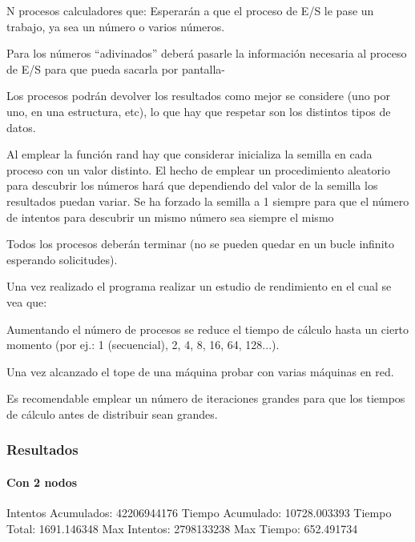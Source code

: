 \documentclass{article}
\begin{document}
	N procesos calculadores que: 
		Esperarán a que el proceso de E/S le pase un trabajo, ya sea un número o varios números. 

		Para los números “adivinados” deberá pasarle la información necesaria al proceso de E/S para que pueda sacarla por pantalla- 

		Los procesos podrán devolver los resultados como mejor se considere (uno por uno, en una estructura, etc), lo que hay que respetar son los distintos tipos de datos. 

		Al emplear la función rand hay que considerar inicializa la semilla en cada proceso con un valor distinto. El hecho de emplear un procedimiento aleatorio para descubrir los números hará que dependiendo del valor de la semilla los resultados puedan variar. Se ha forzado la semilla a 1 siempre para que el número de intentos para descubrir un mismo número sea siempre el mismo 

	Todos los procesos deberán terminar (no se pueden quedar en un bucle infinito esperando solicitudes). 

Una vez realizado el programa realizar un estudio de rendimiento en el cual se vea que:

	Aumentando el número de procesos se reduce el tiempo de cálculo hasta un cierto momento (por ej.: 1 (secuencial), 2, 4, 8, 16, 64, 128...). 

	Una vez alcanzado el tope de una máquina probar con varias máquinas en red. 

	Es recomendable emplear un número de iteraciones grandes para que los tiempos de cálculo antes de distribuir sean grandes.

\subsubsection{Resultados}

\paragraph{Con 2 nodos}

Intentos Acumulados: 42206944176 
Tiempo Acumulado:    10728.003393   
Tiempo Total:        1691.146348   
Max Intentos:        2798133238 
Max Tiempo:          652.491734
\end{document}
